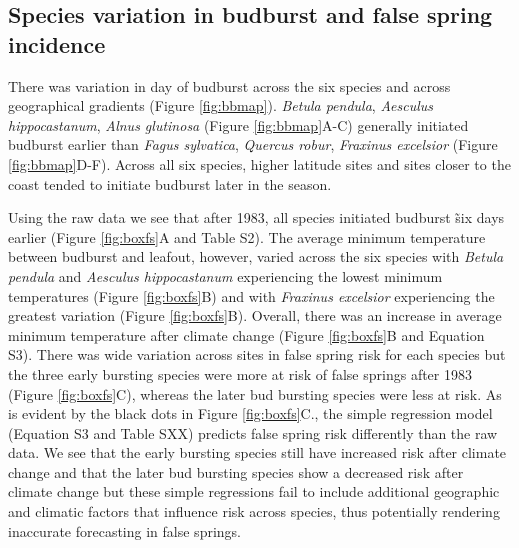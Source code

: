 \documentclass{article}\usepackage[]{graphicx}\usepackage[]{color}
\begin{document}
\subsection*{Species variation in budburst and false spring incidence}
There was variation in day of budburst across the six species and across geographical gradients (Figure \ref{fig:bbmap}). \textit{Betula pendula}, \textit{Aesculus hippocastanum}, \textit{Alnus glutinosa} (Figure \ref{fig:bbmap}A-C) generally initiated budburst earlier than \textit{Fagus sylvatica}, \textit{Quercus robur}, \textit{Fraxinus excelsior} (Figure \ref{fig:bbmap}D-F). Across all six species, higher latitude sites and sites closer to the coast tended to initiate budburst later in the season.  

Using the raw data we see that after 1983, all species initiated budburst \~ six days earlier (Figure \ref{fig:boxfs}A and Table S2). The average minimum temperature between budburst and leafout, however, varied across the six species with \textit{Betula pendula} and \textit{Aesculus hippocastanum} experiencing the lowest minimum temperatures (Figure \ref{fig:boxfs}B) and with \textit{Fraxinus excelsior} experiencing the greatest variation (Figure \ref{fig:boxfs}B). Overall, there was an increase in average minimum temperature after climate change (Figure \ref{fig:boxfs}B and Equation S3). There was wide variation across sites in false spring risk for each species but the three early bursting species were more at risk of false springs after 1983 (Figure \ref{fig:boxfs}C), whereas the later bud bursting species were less at risk. As is evident by the black dots in Figure \ref{fig:boxfs}C., the simple regression model (Equation S3 and Table SXX) predicts false spring risk differently than the raw data. We see that the early bursting species still have increased risk after climate change and that the later bud bursting species show a decreased risk after climate change but these simple regressions fail to include additional geographic and climatic factors that influence risk across species, thus potentially rendering inaccurate forecasting in false springs. 
\end{document}
